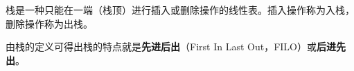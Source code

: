 栈是一种{只能在一端（栈顶）进行插入或删除操作的线性表}。插入操作称为入栈，删除操作称为出栈。

由栈的定义可得出栈的特点就是\textbf{{先进后出}}（First In Last
Out，FILO）或\textbf{{后进先出}}。
